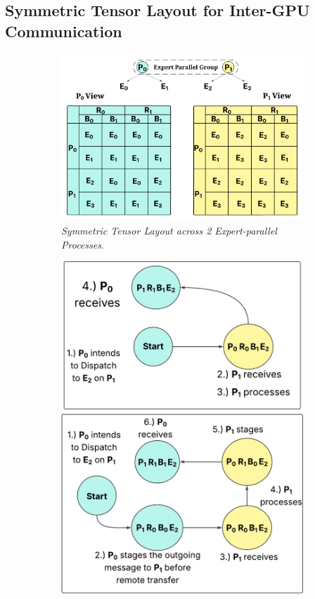 \subsection{Symmetric Tensor Layout for Inter-GPU Communication}\label{subsec:symmetric-tensor-layout}
\begin{figure}[!ht]
    \centering
    \begin{subfigure}{0.45\textwidth}
        \centering
        \includegraphics[width=\linewidth, keepaspectratio]{figures/mem_layout}
        \caption{\emph{Symmetric Tensor Layout across 2 Expert-parallel Processes}.}
        \label{fig:mem_layout}
    \end{subfigure}
    \begin{subfigure}{0.25\textwidth}
        \centering
        \includegraphics[width=\linewidth, keepaspectratio]{figures/sm_big}

\end{subfigure}
\end{figure}
